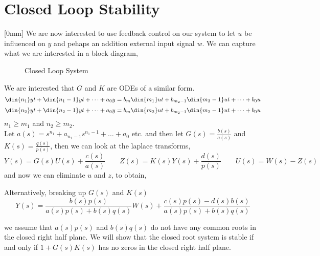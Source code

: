 \section{Closed Loop Stability}[0mm]
We are now interested to use feedback control on our system to let $u$ be influenced on $y$ and pehaps an addition external input signal $w$. We can capture what we are interested in a block diagram,

\begin{figure}[!ht]
\centering
{}
\caption{Closed Loop System}
\end{figure}

\noindent
We are interested that $G$ and $K$ are ODEs of a similar form.
$$ \din {n_1} y t + \din {n_1-1} y t + \dots + a_0y = b_m\din {m_1} u t + b_{m_2-1}\din {m_3-1} u t + \dots + b_0u$$
$$ \din {n_2} y t + \din {n_2-1} y t + \dots + a_0y = b_m\din {m_2} u t + b_{m_2-1}\din {m_2-1} u t + \dots + b_0u$$
$n_1 \ge m_1$ and $n_2 \ge m_2$.\\
Let $a(s) = s^{n_1} + a_{n_1 - 1}s^{n_1 - 1} + \dots + a_0$ etc. and then let $G(s) = \frac{b(s)}{a(s)}$ and $K(s) = \frac{q(s)}{p(s)}$, then we can look at the laplace transforms,
$$ Y(s) = G(s)U(s) + \frac{c(s)}{a(s)} \qquad Z(s) = K(s)Y(s) + \frac{d(s)}{p(s)} \qquad U(s) = W(s) - Z(s) $$
and now we can eliminate $u$ and $z$, to obtain,

Alternatively, breaking up $G(s)$ and $K(s)$
$$ Y(s) = \frac{b(s) p(s)}{a(s) p(s) + b(s) q(s)} W(s) + \frac{c(s)p(s) - d(s)b(s)}{a(s)p(s) + b(s)q(s)} $$

we assume that $a(s)p(s)$ and $b(s)q(s)$ do not have any common roots in the closed right half plane. We will show that the closed root system is stable if and only if $1 + G(s)K(s)$ has no zeros in the closed right half plane. \\

